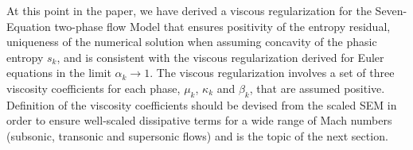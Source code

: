 \documentclass[preprint,10pt]{elsarticle}
\begin{document}
%
At this point in the paper, we have derived a viscous regularization for the Seven-Equation two-phase flow Model that ensures positivity of the entropy residual, uniqueness of the numerical solution when assuming concavity of the phasic entropy $s_k$, and is consistent with the viscous regularization derived for Euler equations \cite{jlg, Marco_paper_low_mach} in the limit $\alpha_k \to 1$. The viscous regularization involves a set of three viscosity coefficients for each phase, $\mu_k$, $\kappa_k$ and $\beta_k$, that are assumed positive. Definition of the viscosity coefficients should be devised from the scaled SEM in order to ensure well-scaled dissipative terms for a wide range of Mach numbers (subsonic, transonic and supersonic flows) and is the topic of the next section.
%
\end{document}
